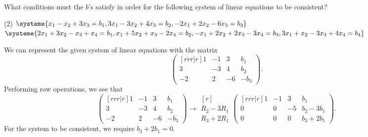 \begin{problem}
    What conditions must the $b$'s satisfy in order for the following system of linear equations to be consistent?
    \begin{tasks}(2)
        \task $\systeme{x_1-x_2+3x_3=b_1,3x_1-3x_2+4x_3=b_2,-2x_1+2x_2-6x_3=b_3}$
        \task $\systeme{2x_1+3x_2-x_3+x_4=b_1,x_1+5x_2+x_3-2x_4=b_2,-x_1+2x_2+2x_3-3x_4=b_3,3x_1+x_2-3x_3+4x_4=b_4}$
    \end{tasks}
\end{problem}
\clearpage
\begin{solution}
    \begin{ppart}
        We can represent the given system of linear equations with the matrix \[\begin{pmatrix}[rrr|r]1 & -1 & 3 & b_1 \\ 3 & -3 & 4 & b_2 \\ -2 & 2 & -6 & -b_3\end{pmatrix}.\] Performing row operations, we see that \[\begin{pmatrix}[rrr|r]1 & -1 & 3 & b_1 \\ 3 & -3 & 4 & b_2 \\ -2 & 2 & -6 & -b_3\end{pmatrix} \rightarrow \begin{matrix}[r] \\ \scriptstyle R_2 - 3R_1 \\ \scriptstyle R_3 + 2R_1\end{matrix} \begin{pmatrix}[rrr|r]1 & -1 & 3 & b_1 \\ 0 & 0 & -5 & b_2 - 3b_1 \\ 0 & 0 & 0 & b_3 + 2b_1\end{pmatrix}.\] For the system to be consistent, we require $b_3 + 2b_1 = 0$.
    \end{ppart}
    \begin{ppart}

\end{ppart}
\end{solution}
